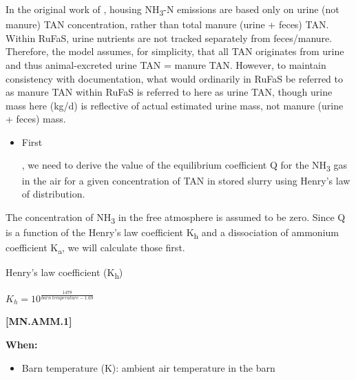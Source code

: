 \begin{refsection}
In the original work of \cite{Rotz2006}, housing NH\textsubscript{3}-N emissions are based only on urine (not manure) TAN concentration, rather than total manure (urine + feces) TAN. Within RuFaS, urine nutrients are not tracked separately from feces/manure. Therefore, the model assumes, for simplicity, that all TAN originates from urine and thus animal-excreted urine TAN = manure TAN. However, to maintain consistency with documentation, what would ordinarily in RuFaS be referred to as manure TAN within RuFaS is referred to here as urine TAN, though urine mass here (kg/d) is reflective of actual estimated urine mass, not manure (urine + feces) mass.
\vspace{0.5cm}

    \begin{itemize}

        \item \hypertarget{HENRY}{First}, we need to derive the value of the equilibrium coefficient Q for the NH\textsubscript{3} gas in the air for a given concentration of TAN in stored slurry using Henry’s law of distribution. 
    \end{itemize}
    \vspace{0.15cm}

\begin{tcolorbox}[colback=white, colframe=black, boxrule=0.5pt, arc=3pt, width=\textwidth]
The concentration of NH\textsubscript{3} in the free atmosphere is assumed to be zero. Since Q is a function of the Henry’s law coefficient K\textsubscript{h} and a dissociation of ammonium coefficient K\textsubscript{a}, we will calculate those first.
\end{tcolorbox}
        \vspace{0.2cm}
        
         Henry’s law coefficient (K\textsubscript{h})
         \vspace{0.2cm}

    \begin{center}
\(K_h = 10 ^\frac{1478} {barn\ temperature - 1.69} \)
    \end{center}
        \vspace{0.5cm} 
    
            {\raggedleft \textbf{[MN.AMM.1]}\par}
            \vspace{0.5cm}
            
\textbf{When:}
    \begin{itemize}
        \item Barn temperature (K): ambient air temperature in the barn 
    \end{itemize}


\end{refsection}
